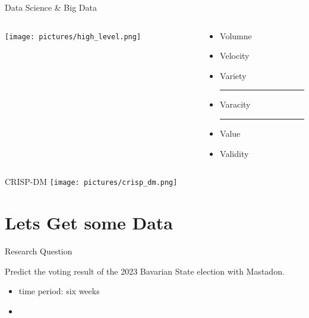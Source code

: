 \documentclass[usenames,dvipsnames,aspectratio=169]{beamer}
\begin{document}
	\begin{frame}{Data Science \& Big Data}
		\begin{columns}
			
			\begin{column}{0.45\textwidth}
				\begin{tcolorbox}[colback=white, colframe=ElixirPurple, arc=3mm, boxrule=0mm, height=0.8\textheight, valign=center, title=DS Perspective]
					\texttt{[image: pictures/high\_level.png]}
				\end{tcolorbox}
			\end{column}
			
			\begin{column}{0.45\textwidth}
				\begin{tcolorbox}[colback=white, colframe=ElixirPurple, arc=3mm, boxrule=0mm, height=0.8\textheight, valign=center, title=Big Data]
					
					\begin{itemize}
						\item Volumne
						\item Velocity
						\item Variety
						\hrule
						\item Varacity
						\hrule
						\item Value
						\item Validity
					
					\end{itemize}
					
				\end{tcolorbox}
			\end{column}
		\end{columns}
	\end{frame}
	
	\begin{frame}{CRISP-DM}
		\texttt{[image: pictures/crisp\_dm.png]}
	\end{frame}
	
	\section{Lets Get some Data}
	\begin{frame}{Research Question}
		
		Predict the voting result of the 2023 Bavarian State election with Mastadon.
		
		\begin{itemize}
			\item time period: six weeks
			\item  
		\end{itemize}
		
	\end{frame}
	
\end{document}
